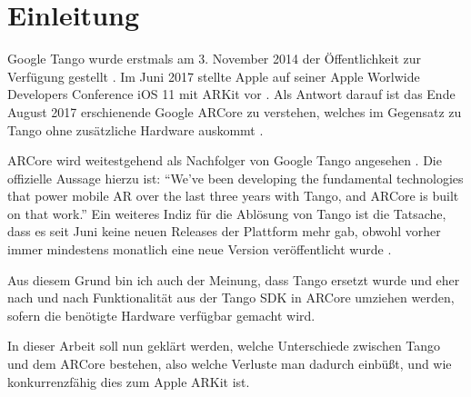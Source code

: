 
\section{Einleitung}

Google Tango wurde erstmals am 3. November 2014 der Öffentlichkeit zur Verfügung gestellt \cite{tango_release_notes}. Im Juni 2017 stellte Apple auf seiner Apple Worlwide Developers Conference iOS 11 mit ARKit vor \cite{ios11_announcement}. Als Antwort darauf ist das Ende August 2017 erschienende Google ARCore zu verstehen, welches im Gegensatz zu Tango ohne zusätzliche Hardware auskommt \cite{arcore_announcement}.\par
ARCore wird weitestgehend als Nachfolger von Google Tango angesehen \cite{cnet_arcore}\cite{heise_arcore}. Die offizielle Aussage hierzu ist: "`We’ve been developing the fundamental technologies that power mobile AR over the last three years with Tango, and ARCore is built on that work."'\cite{arcore_announcement} Ein weiteres Indiz für die Ablösung von Tango ist die Tatsache, dass es seit Juni keine neuen Releases der Plattform mehr gab, obwohl vorher immer mindestens monatlich eine neue Version veröffentlicht wurde \cite{tango_release_notes}. \par
Aus diesem Grund bin ich auch der Meinung, dass Tango ersetzt wurde und eher nach und nach Funktionalität aus der Tango SDK in ARCore umziehen werden, sofern die benötigte Hardware verfügbar gemacht wird.\par
In dieser Arbeit soll nun geklärt werden, welche Unterschiede zwischen Tango und dem ARCore bestehen, also welche Verluste man dadurch einbüßt, und wie konkurrenzfähig dies zum Apple ARKit ist.